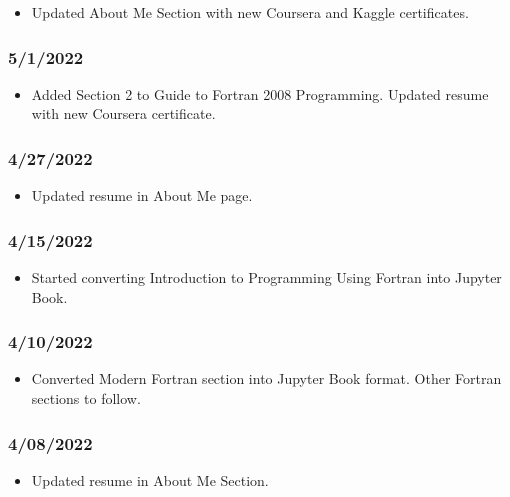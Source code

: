 \begin{itemize}
\item Updated About Me Section with new Coursera and Kaggle certificates.
\end{itemize}

\subsubsection{5/1/2022}

\begin{itemize}
\item Added Section 2 to Guide to Fortran 2008 Programming. Updated resume with new Coursera certificate.
\end{itemize}

\subsubsection{4/27/2022}

\begin{itemize}
\item Updated resume in About Me page.
\end{itemize}

\subsubsection{4/15/2022}

\begin{itemize}
\item Started converting Introduction to Programming Using Fortran into Jupyter Book.
\end{itemize}

\subsubsection{4/10/2022}

\begin{itemize}
\item Converted Modern Fortran section into Jupyter Book format. Other Fortran sections to follow.
\end{itemize}

\subsubsection{4/08/2022}

\begin{itemize}
\item Updated resume in About Me Section.
\end{itemize}

